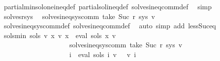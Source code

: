 \begin{isabellebody}
\ partial{\isacharunderscore}{\kern0pt}min{\isacharunderscore}{\kern0pt}sol{\isacharunderscore}{\kern0pt}one{\isacharunderscore}{\kern0pt}ineq{\isacharunderscore}{\kern0pt}def\ partial{\isacharunderscore}{\kern0pt}sol{\isacharunderscore}{\kern0pt}ineq{\isacharunderscore}{\kern0pt}def\ solves{\isacharunderscore}{\kern0pt}ineq{\isacharunderscore}{\kern0pt}comm{\isacharunderscore}{\kern0pt}def\ \isamarkupfalse%
\ simp\isanewline
\ \ \isamarkupfalse%
\ solves{\isacharunderscore}{\kern0pt}r{\isacharunderscore}{\kern0pt}sys\ \isamarkupfalse%
\ {\isachardoublequoteopen}solves{\isacharunderscore}{\kern0pt}ineq{\isacharunderscore}{\kern0pt}sys{\isacharunderscore}{\kern0pt}comm\ {\isacharparenleft}{\kern0pt}take\ {\isacharparenleft}{\kern0pt}Suc\ r{\isacharparenright}{\kern0pt}\ sys{\isacharparenright}{\kern0pt}\ v{\isachardoublequoteclose}\isanewline
\ \ \ \ \isamarkupfalse%
\ solves{\isacharunderscore}{\kern0pt}ineq{\isacharunderscore}{\kern0pt}sys{\isacharunderscore}{\kern0pt}comm{\isacharunderscore}{\kern0pt}def\ solves{\isacharunderscore}{\kern0pt}ineq{\isacharunderscore}{\kern0pt}comm{\isacharunderscore}{\kern0pt}def\ \isamarkupfalse%
\ {\isacharparenleft}{\kern0pt}auto\ simp\ add{\isacharcolon}{\kern0pt}\ less{\isacharunderscore}{\kern0pt}Suc{\isacharunderscore}{\kern0pt}eq{\isacharparenright}{\kern0pt}\isanewline
{}\isamarkupfalse%
%
\endisatagproof
{\isafoldproof}%
%
\isadelimproof
\isanewline
%
\endisadelimproof
\isanewline
{}\isamarkupfalse%
\ sols{\isacharprime}{\kern0pt}{\isacharunderscore}{\kern0pt}min{\isacharcolon}{\kern0pt}\ {\isachardoublequoteopen}{\isasymforall}sols{}\ v{}{\isachardot}{\kern0pt}\ {\isacharparenleft}{\kern0pt}{\isasymforall}x{\isachardot}{\kern0pt}\ v{}\ x\ {\isacharequal}{\kern0pt}\ eval\ {\isacharparenleft}{\kern0pt}sols{}\ x{\isacharparenright}{\kern0pt}\ v{}{\isacharparenright}{\kern0pt}\isanewline
\ \ \ \ \ \ \ \ \ \ \ \ \ \ \ \ \ \ \ {\isasymand}\ solves{\isacharunderscore}{\kern0pt}ineq{\isacharunderscore}{\kern0pt}sys{\isacharunderscore}{\kern0pt}comm\ {\isacharparenleft}{\kern0pt}take\ {\isacharparenleft}{\kern0pt}Suc\ r{\isacharparenright}{\kern0pt}\ sys{\isacharparenright}{\kern0pt}\ v{}\isanewline
\ \ \ \ \ \ \ \ \ \ \ \ \ \ \ \ \ \ \ {\isasymlongrightarrow}\ {\isacharparenleft}{\kern0pt}{\isasymforall}i{\isachardot}{\kern0pt}\ {\isasymPsi}\ {\isacharparenleft}{\kern0pt}eval\ {\isacharparenleft}{\kern0pt}sols{\isacharprime}{\kern0pt}\ i{\isacharparenright}{\kern0pt}\ v{}{\isacharparenright}{\kern0pt}\ {\isasymsubseteq}\ {\isasymPsi}\ {\isacharparenleft}{\kern0pt}v{}\ i{\isacharparenright}{\kern0pt}{\isacharparenright}{\kern0pt}{\isachardoublequoteclose}\isanewline

\end{isabellebody}
